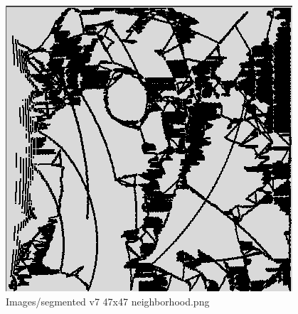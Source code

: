 \begin{figure}[H]
\includegraphics[width=\textwidth]{Images/segmented_v7_47x47_neighborhood.png}
\caption{Images/segmented v7 47x47 neighborhood.png}
\label{fig:Images/segmented v7 47x47 neighborhood.png}
\end{figure}
